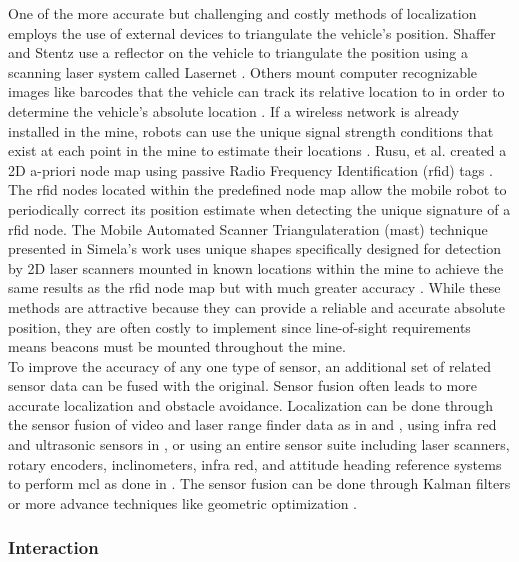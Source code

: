 One of the more accurate but challenging and costly methods of localization employs the use of external devices to triangulate the vehicle's position. Shaffer and Stentz use a reflector on the vehicle to triangulate the position using a scanning laser system called Lasernet \cite{both}. Others mount computer recognizable images like barcodes that the vehicle can track its relative location to in order to determine the vehicle's absolute location \cite{barcode}. If a wireless network is already installed in the mine, robots can use the unique signal strength conditions that exist at each point in the mine to estimate their locations \cite{signal}. Rusu, et al. created a 2D a-priori node map using passive Radio Frequency Identification (\acrshort{rfid}) tags \cite{rfirusu}. The \acrshort{rfid} nodes located within the predefined node map allow the mobile robot to periodically correct its position estimate when detecting the unique signature of a \acrshort{rfid} node. The Mobile Automated Scanner Triangulateration (\acrshort{mast}) technique presented in Simela's work uses unique shapes specifically designed for detection by 2D laser scanners mounted in known locations within the mine to achieve the same results as the \acrshort{rfid} node map but with much greater accuracy \cite{simela}. While these methods are attractive because they can provide a reliable and accurate absolute position, they are often costly to implement since line-of-sight requirements means beacons must be mounted throughout the mine.\\

To improve the accuracy of any one type of sensor, an additional set of related sensor data can be fused with the original. Sensor fusion often leads to more accurate localization and obstacle avoidance. Localization can be done through the sensor fusion of video and laser range finder data as in \cite{vis1} and \cite{vis2}, using infra red and ultrasonic sensors in \cite{irsonic}, or using an entire sensor suite including laser scanners, rotary encoders, inclinometers, infra red, and attitude heading reference systems to perform \acrshort{mcl} as done in \cite{carlo}. The sensor fusion can be done through Kalman filters or more advance techniques like geometric optimization \cite{geom}.\\

\subsubsection{Interaction}
\label{sec:interact}

